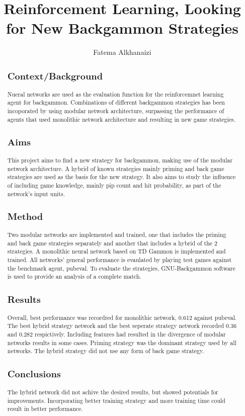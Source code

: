 \documentclass[12pt,a4paper]{article}
\title{Reinforcement Learning, Looking for New Backgammon Strategies}
\author{Fatema Alkhanaizi}
\date{}
\begin{document}
\maketitle

\begin{abstract}
\subsection{Context/Background}
Nueral networks are used as the evaluation function for the reinforcemnet learning agent for backgammon. Combinations of different backgammon strategies has been incoporated by using modular network architecture, surpassing the performance of agents that used monolithic network architecture and resulting in new game strategies.
\subsection{Aims}
This project aims to find a new strategy for backgammon, making use of the modular network architecture. A hybrid of known strategies mainly priming and back game strategies are used as the basis for the new strategy. It also aims to study the influence of including game knowledge, mainly pip count and hit probability, as part of the network's input units. 
\subsection{Method}
Two modular networks are implemented and trained, one that includes the priming and back game strategies separately and another that includes a hybrid of the 2 strategies. A monolithic neural network based on TD Gammon is implemented and trained. All networks' general performance is evaulated by playing test games against the benchmark agent, pubeval. To evaluate the strategies, GNU-Backgammon software is used to provide an analysis of a complete match.
\subsection{Results}
Overall, best performance was recordred for monolithic network, 0.612 against pubeval. The best hybrid strategy network and the best seperate strategy network recorded 0.36 and 0.282 respictively. Including features had resulted in the divergence of modular networks results in some cases. Priming strategy was the dominant strategy used by all networks. The hybrid strategy did not use any form of back game strategy. 
\subsection{Conclusions}
The hybrid network did not achive the desired results, but showed potentials for improvements. Incorporating better training strategy and more training time could result in better performance. 
\end{abstract}
\end{document}
